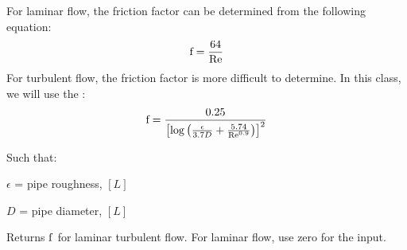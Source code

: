 \documentclass[letterpaper,10pt,english]{sphinxmanual}
\begin{document}
For laminar flow, the friction factor can be determined from the following equation:
\begin{equation}\label{equation:Fluids_Review/Fluids_Review_Design:Fluids_Review/Fluids_Review_Design:11}
\begin{split}{\rm{f}} = \frac{64}{\rm{Re}}\end{split}
\end{equation}
For turbulent flow, the friction factor is more difficult to determine. In this class, we will use the :
\begin{equation}\label{equation:Fluids_Review/Fluids_Review_Design:Fluids_Review/Fluids_Review_Design:12}
\begin{split}{\rm{f}} = \frac{0.25} {\left[ \log \left( \frac{\epsilon }{3.7D} + \frac{5.74}{{\rm Re}^{0.9}} \right) \right]^2}\end{split}
\end{equation}
\begin{DUlineblock}{0em}
\item[] Such that:
\item[] \(\epsilon\) = pipe roughness, \([L]\)
\item[] \(D\) = pipe diameter, \([L]\)
\end{DUlineblock}




  Returns \(\rm{f}\) for laminar  turbulent flow. For laminar flow, use zero for the  input.
\end{document}
